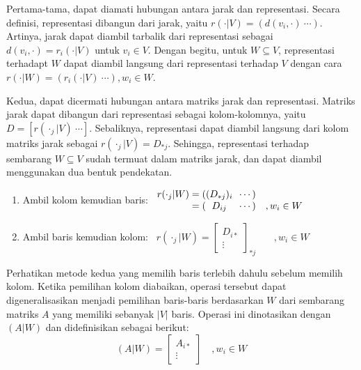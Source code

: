 Pertama-tama, dapat diamati hubungan antara jarak dan representasi. Secara definisi, representasi dibangun dari jarak, yaitu \(r(\cdot|V)=(d(v_i,\cdot)\ \cdots)\). Artinya, jarak dapat diambil tarbalik dari representasi sebagai \(d(v_i,\cdot) = r_i(\cdot|V)\) untuk \(v_i \in V\). Dengan begitu, untuk \(W \subseteq V\), representasi terhadapt \(W\) dapat diambil langsung dari representasi terhadap \(V\) dengan cara \(r(\cdot|W) = (r_i(\cdot|V)\ \cdots), w_i \in W\).

Kedua, dapat dicermati hubungan antara matriks jarak dan representasi. Matriks jarak dapat dibangun dari representasi sebagai kolom-kolomnya, yaitu \(D = [r(\cdot_j|V)\ \cdots]\). Sebaliknya, representasi dapat diambil langsung dari kolom matriks jarak sebagai \(r(\cdot_j|V) = D_{*j}\). Sehingga, representasi terhadap sembarang \(W \subseteq V\) sudah termuat dalam matriks jarak, dan dapat diambil menggunakan dua bentuk pendekatan.
\begin{enumerate}
	\item Ambil kolom kemudian baris:
		\(
		\begin{array}{r@{}c@{\ }l}
			r(\cdot_j|W) = (&(D_{*j})_i&\ \cdots) \\
			= (&D_{ij}&\ \cdots) \quad, w_i \in W
		\end{array}
		\)
	\item Ambil baris kemudian kolom:
		\, \( r(\cdot_j|W) = \left[ \begin{array}{c} D_{i*}\\ \vdots \end{array} \right]_{\displaystyle *j} \;\;\;\quad, w_i \in W \)
\end{enumerate}

Perhatikan metode  kedua yang memilih baris terlebih dahulu sebelum memilih kolom. Ketika pemilihan kolom diabaikan, operasi tersebut dapat digeneralisasikan menjadi pemilihan baris-baris berdasarkan \(W\) dari sembarang matriks \(A\) yang memiliki sebanyak \(|V|\) baris. Operasi ini dinotasikan dengan \((A|W)\) dan didefinisikan sebagai berikut:
	\[ (A|W) = \left[ \begin{array}{c} A_{i*}\\ \vdots \end{array} \right] \quad, w_i \in W \]

